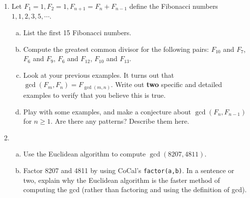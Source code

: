 \documentclass[12pt]{amsart}
\theoremstyle{plain}
\theoremstyle{definition}
\begin{document}
\begin{enumerate}[1.]
\item Let $F_1 = 1, F_2 = 1, F_{n+1} = F_n + F_{n-1}$ define the Fibonacci numbers $1,1,2,3,5, \cdots$.
		\begin{enumerate}[a.]
			\item List the first 15 Fibonacci numbers.
				\begin{framed}
				\vspace{2in}
				\end{framed}
			\item Compute the greatest common divisor for the following pairs: $F_{10}$ and $F_7$, $F_6$ and $F_9$, $F_6$ and $F_{12}$, $F_{10}$ and $F_{13}$.
				\begin{framed}
				\vspace{2in}
				\end{framed}
			\newpage \item Look at your previous examples. It turns out that $\gcd(F_m,F_n) = F_{\gcd(m,n)}$.  Write out \textbf{two} specific and detailed examples to verify that you believe this is true.
			\begin{framed}
			\vspace{1in}
			\end{framed}
			\begin{framed}
			\vspace{1in}
			\end{framed}
			\item Play with some examples, and make a conjecture about $\gcd(F_n,F_{n-1})$ for $n \geq 1$.  Are there any patterns?  Describe them here.
			\begin{framed}
			\vspace{2.5in}
			\end{framed}
		\end{enumerate}
	\item
    	\begin{enumerate}[a.]
        	\item Use the Euclidean algorithm to compute $\gcd(8207,4811)$.
            \begin{framed}
            \vspace{2in}
            \end{framed}
        \newpage \item Factor 8207 and 4811 by using CoCal's \texttt{factor(a,b)}.  In a sentence or two, explain why the Euclidean algorithm is the faster method of computing the gcd (rather than factoring and using the definition of gcd).
        	\begin{framed}

\end{framed}
\end{enumerate}
\end{enumerate}
\end{document}
